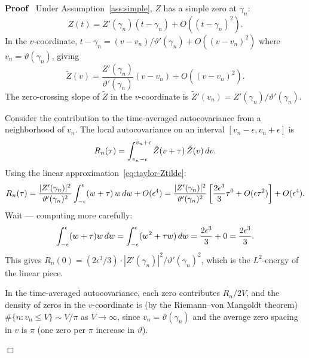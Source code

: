 \documentclass{article}
\newenvironment{proof}{\noindent\textbf{Proof\ }}{\hspace*{\fill}$\Box$\medskip}
\begin{document}
\begin{proof}
  Under Assumption~\ref{ass:simple}, $Z$ has a simple zero at $\gamma_n$:
  \begin{equation}
    \label{eq:taylor-Z} Z (t) = Z' (\gamma_n)  (t - \gamma_n) + O ((t -
    \gamma_n)^2) .
  \end{equation}
  In the $v$-coordinate, $t - \gamma_n = (v - v_n) / \vartheta' (\gamma_n) + O
  ((v - v_n)^2)$ where $v_n = \vartheta (\gamma_n)$, giving
  \begin{equation}
    \label{eq:taylor-Ztilde} \tilde{Z} (v) = \frac{Z' (\gamma_n)}{\vartheta'
    (\gamma_n)}  (v - v_n) + O ((v - v_n)^2) .
  \end{equation}
  The zero-crossing slope of $\tilde{Z}$ in the $v$-coordinate is $\tilde{Z}'
  (v_n) = Z' (\gamma_n) / \vartheta' (\gamma_n)$.
  
  Consider the contribution to the time-averaged autocovariance from a
  neighborhood of $v_n$. The local autocovariance on an interval $[v_n -
  \epsilon, v_n + \epsilon]$ is
  \[ R_n (\tau) = \int_{v_n - \epsilon}^{v_n + \epsilon} \tilde{Z}  (v + \tau)
     \hspace{0.17em} \tilde{Z} (v)  \hspace{0.17em} dv. \]
  Using the linear approximation~\eqref{eq:taylor-Ztilde}:
  \begin{equation}
    \label{eq:Rn-local} R_n (\tau) = \frac{|Z' (\gamma_n) |^2}{\vartheta'
    (\gamma_n)^2}  \int_{- \epsilon}^{\epsilon} (w + \tau)  \hspace{0.17em} w
    \hspace{0.17em} dw + O (\epsilon^4) = \frac{|Z' (\gamma_n) |^2}{\vartheta'
    (\gamma_n)^2}  \left[ \frac{2 \epsilon^3}{3} \tau^0 + O (\epsilon \tau^2)
    \right] + O (\epsilon^4) .
  \end{equation}
  Wait --- computing more carefully:
  \[ \int_{- \epsilon}^{\epsilon} (w + \tau) w \hspace{0.17em} dw = \int_{-
     \epsilon}^{\epsilon} (w^2 + \tau w)  \hspace{0.17em} dw = \frac{2
     \epsilon^3}{3} + 0 = \frac{2 \epsilon^3}{3} . \]
  This gives $R_n (0) = (2 \epsilon^3 / 3) \cdot |Z' (\gamma_n) |^2 /
  \vartheta' (\gamma_n)^2$, which is the $L^2$-energy of the linear piece.
  
  In the time-averaged autocovariance, each zero contributes $R_n / 2 V$, and
  the density of zeros in the $v$-coordinate is (by the Riemann--von Mangoldt
  theorem) $\# \{n : v_n \le V\} \sim V / \pi$ as $V \to \infty$, since $v_n =
  \vartheta (\gamma_n)$ and the average zero spacing in $v$ is $\pi$ (one zero
  per $\pi$ increase in $\vartheta$).
  

\end{proof}
\end{document}
